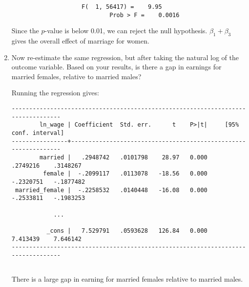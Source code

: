 \documentclass[11pt,twoside,openany]{memoir}
\begin{document}
\begin{question}
\begin{enumerate}[label = (\alph*),itemsep=1pt,topsep=3pt]
{\begin{solution}
\begin{Verbatim}
                    F(  1, 56417) =    9.95
                            Prob > F =    0.0016             
                \end{Verbatim}
            Since the $p$-value is below 0.01, we can reject the null hypothesis. $\beta_1 + \beta_3$ gives the overall effect of marriage for women.
            \end{solution}}
        
        \item Now re-estimate the same regression, but after taking the natural log of the outcome variable. Based on your results, is there a gap in earnings for married females, relative to married males?
            {\color{blue} \begin{solution}
                Running the regression gives:
                \begin{Verbatim}
---------------------------------------------------------------------------------
        ln_wage | Coefficient  Std. err.      t    P>|t|     [95% conf. interval]
----------------+----------------------------------------------------------------
        married |   .2948742   .0101798    28.97   0.000     .2749216    .3148267
         female |  -.2099117   .0113078   -18.56   0.000    -.2320751   -.1877482
 married_female |  -.2258532   .0140448   -16.08   0.000    -.2533811   -.1983253

            ...

          _cons |   7.529791   .0593628   126.84   0.000     7.413439    7.646142
---------------------------------------------------------------------------------
                
                \end{Verbatim}
            There is a large gap in earning for married females relative to married males. 
            \end{solution}}
        

\end{enumerate}
\end{question}
\end{document}
